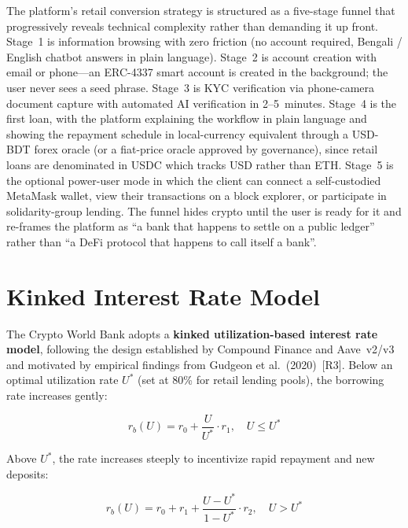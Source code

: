 \documentclass[12pt,a4paper]{report}
\begin{document}
The platform's retail conversion strategy is structured as a five-stage funnel that progressively reveals technical complexity rather than demanding it up front. Stage~1 is information browsing with zero friction (no account required, Bengali / English chatbot answers in plain language). Stage~2 is account creation with email or phone---an ERC-4337 smart account is created in the background; the user never sees a seed phrase. Stage~3 is KYC verification via phone-camera document capture with automated AI verification in 2--5~minutes. Stage~4 is the first loan, with the platform explaining the workflow in plain language and showing the repayment schedule in local-currency equivalent through a USD-BDT forex oracle (or a fiat-price oracle approved by governance), since retail loans are denominated in USDC which tracks USD rather than ETH. Stage~5 is the optional power-user mode in which the client can connect a self-custodied MetaMask wallet, view their transactions on a block explorer, or participate in solidarity-group lending. The funnel hides crypto until the user is ready for it and re-frames the platform as ``a bank that happens to settle on a public ledger'' rather than ``a DeFi protocol that happens to call itself a bank''.


\section{Kinked Interest Rate Model}
\label{sec:kinked-rate}

The Crypto World Bank adopts a \textbf{kinked utilization-based interest rate model}, following the design established by Compound Finance and Aave~v2/v3 and motivated by empirical findings from Gudgeon et al.~(2020)~[R3]. Below an optimal utilization rate $U^*$ (set at 80\% for retail lending pools), the borrowing rate increases gently:

\begin{equation}
r_b(U) = r_0 + \frac{U}{U^*} \cdot r_1, \quad U \leq U^* \tag{Formula 18}
\end{equation}

Above $U^*$, the rate increases steeply to incentivize rapid repayment and new deposits:

\begin{equation}
r_b(U) = r_0 + r_1 + \frac{U - U^*}{1 - U^*} \cdot r_2, \quad U > U^* \tag{Formula 19}
\end{equation}
\end{document}
